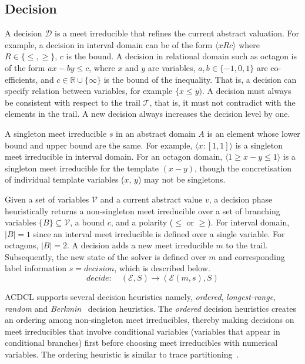 \subsection{Decision}
A decision $\mathcal{D}$ is a meet irreducible that refines the 
current abstract valuation.  For example, a decision in interval 
domain can be of the form $\langle x R c \rangle$ where 
$R \in \{\leq, \geq\}$, $c$ is the bound.  A decision in 
relational domain such as octagon is of the form $ax - by \leq c$, 
where $x$ and $y$ are variables, $a,b \in \{-1,0,1\}$ are co-efficients, 
and $c \in \mathbb{R}\cup\{\infty\}$ is the bound of the inequality.  
That is, a decision can specify relation between variables, for example 
$\{x \leq y)$.  A decision must always be consistent with respect to 
the trail $\mathcal{T}$, that is, it must not contradict with the elements 
in the trail.  A new decision always increases the decision level by one. 

A singleton meet irreducible $s$ in an abstract domain $A$ is an element 
whose lower bound and upper bound are the same.  For example, 
$\langle x:[1,1] \rangle$ is a singleton meet irreducible in interval domain.  
For an octagon domain, $\langle 1 \geq x-y \leq 1 \rangle$ is a singleton meet 
irreducible for the template $(x-y)$, though the concretisation of individual 
template variables ($x$, $y$) may not be singletons.   

Given a set of variables $\mathcal{V}$ and a current abstract value $v$, 
a decision phase heuristically returns a non-singleton meet irreducible 
over a set of branching variables $\{B\} \subseteq \mathcal{V}$, a 
bound $c$, and a polarity ($\leq$ or $\geq$).  For interval domain, $|B|=1$ 
since an interval meet irreducible is defined over a single variable.  For 
octagons, $|B|=2$.  A decision adds a new meet irreducible $m$ to the trail.  
Subsequently, the new state of the solver is defined over $m$ and corresponding 
label information $s=decision$, which is described below. 
\[decide: \quad (\mathcal{E},S) \rightarrow (\mathcal{E}(m,s),S) \]


ACDCL supports several decision heuristics namely, {\em ordered}, 
{\em longest-range}, {\em random} and 
{\em Berkmin}~\cite{eugoldberg07} decision heuristics.  
The {\em ordered} decision heuristics creates an ordering among non-singleton 
meet irreducibles, thereby making decisions on meet irreducibles that involve 
conditional variables (variables that appear in conditional branches) first 
before choosing meet irreducibles with numerical variables.  
The ordering heuristic is similar to trace partitioning~\cite{toplas07}.  

